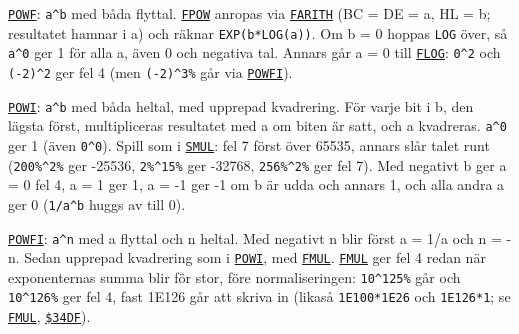 \begin{Listing}
\Gap
{}
\begin{Note}\par\noindent \hyperlink{l:POWF}{\texttt{POWF}}: \texttt{a\^{}b} med båda flyttal. \hyperlink{l:FPOW}{\texttt{FPOW}} anropas via \hyperlink{l:FARITH}{\texttt{FARITH}} (BC = DE = a, HL = b; resultatet hamnar i a) och räknar \texttt{EXP(b*LOG(a))}. Om b = 0 hoppas \texttt{LOG} över, så \texttt{a\^{}0} ger 1 för alla a, även 0 och negativa tal. Annars går a {}= 0 till \hyperlink{l:FLOG}{\texttt{FLOG}}: \texttt{0\^{}2} och \texttt{(\mbox{-}2)\^{}2} ger fel 4 (men \texttt{(\mbox{-}2)\^{}3\%} går via \hyperlink{l:POWFI}{\texttt{POWFI}}).\par
\par\noindent \hyperlink{l:POWI}{\texttt{POWI}}: \texttt{a\^{}b} med båda heltal, med upprepad kvadrering. För varje bit i b, den lägsta först, multipliceras resultatet med a om biten är satt, och a kvadreras. \texttt{a\^{}0} ger 1 (även \texttt{0\^{}0}). Spill som i \hyperlink{l:SMUL}{\texttt{SMUL}}: fel 7 först över 65535, annars slår talet runt (\texttt{200\%\^{}2\%} ger \mbox{-}25536, \texttt{2\%\^{}15\%} ger \mbox{-}32768, \texttt{256\%\^{}2\%} ger fel 7). Med negativt b ger a = 0 fel 4, a = 1 ger 1, a = \mbox{-}1 ger \mbox{-}1 om b är udda och annars 1, och alla andra a ger 0 (\texttt{1/a\^{}{}b{}} huggs av till 0).\par
\par\noindent \hyperlink{l:POWFI}{\texttt{POWFI}}: \texttt{a\^{}n} med a flyttal och n heltal. Med negativt n blir först a = 1/a och n = \mbox{-}n. Sedan upprepad kvadrering som i \hyperlink{l:POWI}{\texttt{POWI}}, med \hyperlink{l:FMUL}{\texttt{FMUL}}. \hyperlink{l:FMUL}{\texttt{FMUL}} ger fel 4 redan när exponenternas summa blir för stor, före normaliseringen: \texttt{10\^{}125\%} går och \texttt{10\^{}126\%} ger fel 4, fast 1E126 går att skriva in (likaså \texttt{1E100*1E26} och \texttt{1E126*1}; se \hyperlink{l:FMUL}{\texttt{FMUL}}, \hyperlink{a:34DF}{\texttt{\$34DF}}).\par\end{Note}

\end{Listing}
